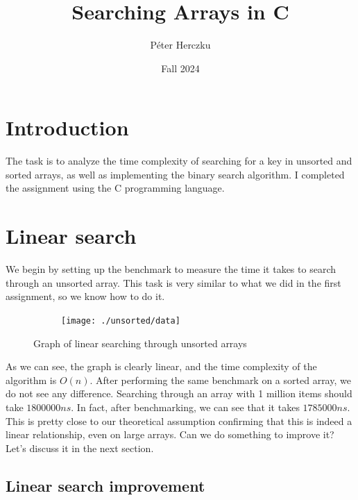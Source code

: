 \documentclass[a4paper,11pt]{article}
\begin{document}
    \title{
        \textbf{Searching Arrays in C}
    }
    \author{Péter Herczku}
    \date{Fall 2024}

    \maketitle

    \section*{Introduction}

    The task is to analyze the time complexity of searching for a key in unsorted and sorted arrays, as well as implementing the binary search algorithm.
    I completed the assignment using the C programming language.

    \section*{Linear search}

    We begin by setting up the benchmark to measure the time it takes to search through an unsorted array.
    This task is very similar to what we did in the first assignment, so we know how to do it.

    \begin{figure}[h]
        \centering
        \begin{subfigure}[b]{.5\textwidth}
            \centering
            \texttt{[image: ./unsorted/data]} %
        \end{subfigure}
        \caption{Graph of linear searching through unsorted arrays}
        \label{fig:graph_1}
    \end{figure}

    As we can see, the graph is clearly linear, and the time complexity of the algorithm is $O(n)$.
    After performing the same benchmark on a sorted array, we do not see any difference.
    Searching through an array with 1 million items should take $1800000 ns$.
    In fact, after benchmarking, we can see that it takes $1785000 ns$.
    This is pretty close to our theoretical assumption confirming that this is indeed a linear relationship, even on large arrays.
    Can we do something to improve it?
    Let's discuss it in the next section.

    \subsection*{Linear search improvement}
\end{document}
